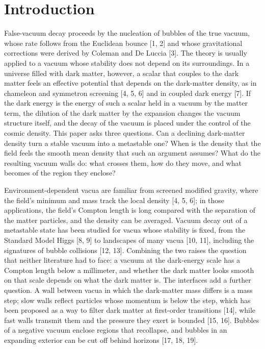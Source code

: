 \documentclass[preprint,12pt]{elsarticle}
\begin{document}
\section{Introduction}
False-vacuum decay proceeds by the nucleation of bubbles of the true vacuum, whose rate follows from the Euclidean bounce [1, 2] and whose gravitational corrections were derived by Coleman and De Luccia [3]. The theory is usually applied to a vacuum whose stability does not depend on its surroundings. In a universe filled with dark matter, however, a scalar that couples to the dark matter feels an effective potential that depends on the dark-matter density, as in chameleon and symmetron screening [4, 5, 6] and in coupled dark energy [7]. If the dark energy is the energy of such a scalar held in a vacuum by the matter term, the dilution of the dark matter by the expansion changes the vacuum structure itself, and the decay of the vacuum is placed under the control of the cosmic density. This paper asks three questions. Can a declining dark-matter density turn a stable vacuum into a metastable one? When is the density that the field feels the smooth mean density that such an argument assumes? What do the resulting vacuum walls do: what crosses them, how do they move, and what becomes of the region they enclose?

Environment-dependent vacua are familiar from screened modified gravity, where the field's minimum and mass track the local density [4, 5, 6]; in those applications, the field's Compton length is long compared with the separation of the matter particles, and the density can be averaged. Vacuum decay out of a metastable state has been studied for vacua whose stability is fixed, from the Standard Model Higgs [8, 9] to landscapes of many vacua [10, 11], including the signatures of bubble collisions [12, 13]. Combining the two raises the question that neither literature had to face: a vacuum at the dark-energy scale has a Compton length below a millimeter, and whether the dark matter looks smooth on that scale depends on what the dark matter is. The interfaces add a further question. A wall between vacua in which the dark-matter mass differs is a mass step; slow walls reflect particles whose momentum is below the step, which has been proposed as a way to filter dark matter at first-order transitions [14], while fast walls transmit them and the pressure they exert is bounded [15, 16]. Bubbles of a negative vacuum enclose regions that recollapse, and bubbles in an expanding exterior can be cut off behind horizons [17, 18, 19].
\end{document}
